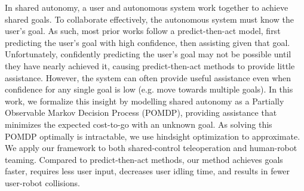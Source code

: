 In shared autonomy, a user and autonomous system work together to achieve shared goals. To collaborate effectively, the autonomous system must know the user's goal. As such, most prior works follow a predict-then-act model, first predicting the user's goal with high confidence, then assisting given that goal. Unfortunately, confidently predicting the user's goal may not be possible until they have nearly achieved it, causing predict-then-act methods to provide little assistance. However, the system can often provide useful assistance even when confidence for any single goal is low (e.g. move towards multiple goals). In this work, we formalize this insight by modelling shared autonomy as a Partially Observable Markov Decision Process (POMDP), providing assistance that minimizes the expected cost-to-go with an unknown goal. As solving this POMDP optimally is intractable, we use hindsight optimization to approximate. We apply our framework to both shared-control teleoperation and human-robot teaming. Compared to predict-then-act methods, our method achieves goals faster, requires less user input, decreases user idling time, and results in fewer user-robot collisions.


